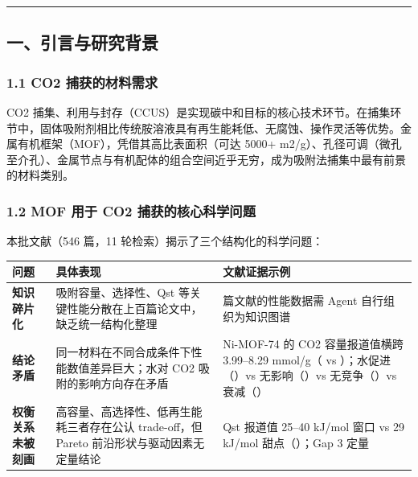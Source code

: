 \documentclass[12pt,a4paper]{ctexart}
\begin{document}
\begin{center}\rule{0.5\linewidth}{0.5pt}\end{center}

\subsection{一、引言与研究背景}\label{ux4e00ux5f15ux8a00ux4e0eux7814ux7a76ux80ccux666f}

\subsubsection{1.1 CO2 捕获的材料需求}\label{co2-ux6355ux83b7ux7684ux6750ux6599ux9700ux6c42}

CO2 捕集、利用与封存（CCUS）是实现碳中和目标的核心技术环节。在捕集环节中，固体吸附剂相比传统胺溶液具有再生能耗低、无腐蚀、操作灵活等优势。金属有机框架（MOF），凭借其高比表面积（可达 5000+ m2/g）、孔径可调（微孔至介孔）、金属节点与有机配体的组合空间近乎无穷，成为吸附法捕集中最有前景的材料类别。

\subsubsection{1.2 MOF 用于 CO2 捕获的核心科学问题}\label{mof-ux7528ux4e8e-co2-ux6355ux83b7ux7684ux6838ux5fc3ux79d1ux5b66ux95eeux9898}

本批文献（546 篇，11 轮检索）揭示了三个结构化的科学问题：

{\def\LTcaptype{none} %
\begin{longtable}[]{@{}
  >{\raggedright\arraybackslash}p{}
  >{\raggedright\arraybackslash}p{}
  >{\raggedright\arraybackslash}p{}@{}}
\toprule\noalign{}
\begin{minipage}[b]{\linewidth}\raggedright
问题
\end{minipage} & \begin{minipage}[b]{\linewidth}\raggedright
具体表现
\end{minipage} & \begin{minipage}[b]{\linewidth}\raggedright
文献证据示例
\end{minipage} \\
\midrule\noalign{}
\endhead
\bottomrule\noalign{}
\endlastfoot
\textbf{知识碎片化} & 吸附容量、选择性、Qst 等关键性能分散在上百篇论文中，缺乏统一结构化整理 & 546 篇文献的性能数据需 Agent 自行组织为知识图谱 \\
\textbf{结论矛盾} & 同一材料在不同合成条件下性能数值差异巨大；水对 CO2 吸附的影响方向存在矛盾 & Ni-MOF-74 的 CO2 容量报道值横跨 3.99--8.29 mmol/g（\cite{p20} vs \cite{p62}）；水促进（\cite{p16}）vs 无影响（\cite{p129}）vs 无竞争（\cite{p139}）vs 衰减（\cite{p128}） \\
\textbf{权衡关系未被刻画} & 高容量、高选择性、低再生能耗三者存在公认 trade-off，但 Pareto 前沿形状与驱动因素无定量结论 & Qst 报道值 25--40 kJ/mol 窗口 vs 29 kJ/mol 甜点（\cite{p27}）；Gap 3 定量 \\
\end{longtable}
}
\end{document}
